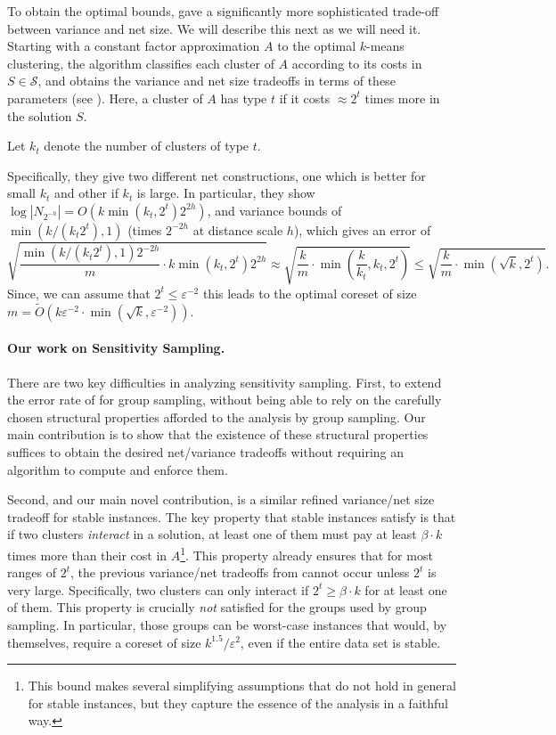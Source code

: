 \documentclass[11pt]{article}
\theoremstyle{restate}
\theoremstyle{definition}
\newcommand{\eps}{\ensuremath{\varepsilon}}
\begin{document}
To obtain the optimal bounds, \cite{Cohen-AddadLSSS22} gave a significantly more sophisticated trade-off between variance and net size. We will describe this next as we will need it.
Starting with a constant factor approximation $A$ to the optimal $k$-means clustering, 
the algorithm classifies each cluster of $A$ 
according to its costs in $S \in \mathcal{S}$, and obtains the variance and net size tradeoffs in terms of these parameters (see ).
Here, a cluster of $A$ has type $t$ if it costs $\approx 2^{t}$ times more in the solution $S$.

Let $k_t$ denote the number of clusters of type $t$.


Specifically, 
they give two different net constructions, one which is better for small $k_t$ and other if $k_t$ is large. In particular, they show $\log |N_{2^{-h}}| = O(k\min(k_t,2^{t})2^{2h})$, and variance bounds of $\min( k/(k_t2^{t}) , 1)$ (times $2^{-2h}$ at distance scale $h$), which gives an error of
\[\sqrt{ \frac{\min( k/(k_t2^{t}) , 1) 2^{-2h}}{m} \cdot  k\min(k_t,2^{t}) 2^{2h}}\approx \sqrt{\frac{k}{m}\cdot \min\left(\frac{k}{k_t},k_t,2^{t}\right)}\leq \sqrt{\frac{k}{m}\cdot \min(\sqrt{k},2^{t})}. \]
Since, we can assume that $2^t \leq \eps^{-2}$ this leads to the optimal  coreset of size ${m = \tilde{O}(k \eps^{-2} \cdot \min(\sqrt{k}, \eps^{-2}))}$.


\paragraph{Our work on Sensitivity Sampling.}
There are two key difficulties in analyzing sensitivity sampling. First, to extend the error rate of \cite{Cohen-AddadLSSS22} for group sampling, without being able to rely on the carefully chosen structural properties afforded to the analysis by group sampling. Our main contribution is to show that the existence of these structural properties suffices to obtain the desired net/variance tradeoffs without requiring an algorithm to compute and enforce them. 

Second, and our main novel contribution, is a similar refined variance/net size tradeoff for stable instances. 
The key property that stable instances satisfy is that if two clusters 
{\em interact} in a solution, at least one of them must pay at least $\beta\cdot k$ times more than their cost in $A$\footnote{This bound makes several simplifying assumptions that do not hold in general for stable instances, but they capture the essence of the analysis in a faithful way.}. 
This property already ensures that for most ranges of $2^{t}$, the previous variance/net tradeoffs from \cite{CSS21,CGSS22,Cohen-AddadLSSS22} cannot occur unless $2^{t}$ is very large. Specifically, two clusters can only interact if $2^{t} \geq \beta\cdot k$ for at least one of them.
This property is crucially \emph{not} satisfied for the groups used by group sampling. In particular, those groups can be worst-case instances that would, by themselves, require a coreset of size $k^{1.5}/\varepsilon^2$, even if the entire data set is stable. 
\end{document}
